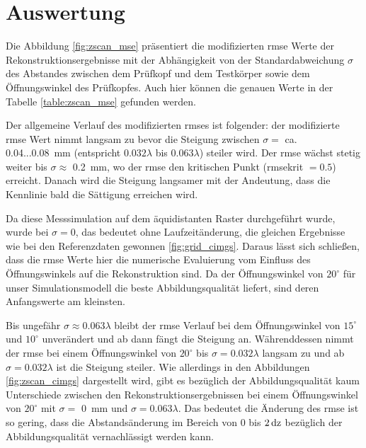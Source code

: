 \section{Auswertung} \label{sec:zscan_evaluation}
Die Abbildung \ref{fig:zscan_mse} präsentiert die modifizierten \acrshort{rmse} Werte der Rekonstruktionsergebnisse mit der Abhängigkeit von der Standardabweichung $\sigma$ des Abstandes zwischen dem Prüfkopf und dem Testkörper sowie dem Öffnungswinkel des Prüfkopfes. Auch hier können die genauen Werte in der Tabelle \ref{table:zscan_mse} gefunden werden. \par
Der allgemeine Verlauf des modifizierten \acrshort{rmse}s ist folgender: der modifizierte \acrshort{rmse} Wert nimmt langsam zu bevor die Steigung zwischen $\sigma =$ ca. 0.04...\SI{0.08}{\milli\metre} (entspricht $0.032 \lambda$ bis $0.063 \lambda$) steiler wird. Der \acrshort{rmse} wächst stetig weiter bis $\sigma \approx$ \SI{0.2}{\milli\metre}, wo der \acrshort{rmse} den kritischen Punkt (\acrshort{rmsekrit} $= 0.5$) erreicht. Danach wird die Steigung langsamer mit der Andeutung, dass die Kennlinie bald die Sättigung erreichen wird. \par
Da diese Messsimulation auf dem äquidistanten Raster durchgeführt wurde, wurde bei $\sigma = 0$, das bedeutet ohne Laufzeitänderung, die gleichen Ergebnisse wie bei den Referenzdaten gewonnen \ref{fig:grid_cimgs}. Daraus lässt sich schließen, dass die \acrshort{rmse} Werte hier die numerische Evaluierung vom Einfluss des Öffnungswinkels auf die Rekonstruktion sind. Da der Öffnungswinkel von $20^{\circ}$ für unser Simulationsmodell die beste Abbildungsqualität liefert, sind deren Anfangswerte am kleinsten. \par
Bis ungefähr $\sigma \approx 0.063 \lambda$ bleibt der \acrshort{rmse} Verlauf bei dem Öffnungswinkel von $15^{\circ}$ und $10^{\circ}$ unverändert und ab dann fängt die Steigung an. Währenddessen nimmt der \acrshort{rmse} bei einem Öffnungswinkel von $20^{\circ}$ bis $\sigma = 0.032 \lambda$  langsam zu und ab $\sigma = 0.032 \lambda$ ist die Steigung steiler. Wie allerdings in den Abbildungen \ref{fig:zscan_cimgs} dargestellt wird, gibt es bezüglich der Abbildungsqualität kaum Unterschiede zwischen den Rekonstruktionsergebnissen bei einem Öffnungswinkel von $20^{\circ}$ mit $\sigma =$ \SI{0}{\milli\metre} und $\sigma = 0.063 \lambda$. Das bedeutet die Änderung des \acrshort{rmse} ist so gering, dass die Abstandsänderung im Bereich von 0 bis $2 \operatorname{dz}$ bezüglich der Abbildungsqualität vernachlässigt werden kann. \par 
